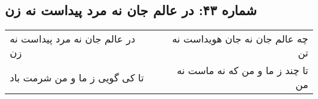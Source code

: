 \begin{center}
\section*{شماره ۴۳: در عالم جان نه مرد پیداست نه زن}
\label{sec:043}
\begin{longtable}{l p{0.5cm} r}
در عالم جان نه مرد پیداست نه زن
&&
چه عالم جان نه جان هویداست نه تن
\\
تا کی گویی ز ما و من شرمت باد
&&
تا چند ز ما و من که نه ماست نه من
\\
\end{longtable}
\end{center}
